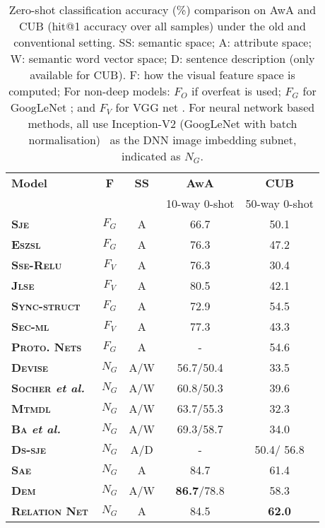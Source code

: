 \documentclass[10pt,twocolumn,letterpaper]{article}
\begin{document}
\setlength{\tabcolsep}{6pt}
\begin{table}[t]
\centering
\footnotesize
\begin{tabular}{@{} lcccc @{}}
\toprule

\textbf{Model} & \textbf{F}     & \textbf{SS}   & \textbf{AwA} & \textbf{CUB} \\ 
 &     &   & 10-way 0-shot & 50-way 0-shot \\ 
\midrule 

\textbf{\textsc{Sje}}~\cite{akata2015evaluation}&$F_{G}$ & A & 66.7 &50.1  \\
\textbf{\textsc{Eszsl}}~\cite{romera2015embarrassingly}&$F_{G}$ & A & 76.3 & 47.2 \\
\textbf{\textsc{Sse}-\textsc{Relu}}~\cite{zhang2015zero}&$F_{V}$ & A & 76.3 & 30.4 \\
\textbf{\textsc{Jlse}}~\cite{zhang2016zero}&$F_{V}$  & A & 80.5 & 42.1 \\ 
\textbf{\textsc{Sync-struct}}~\cite{changpinyo2016synthesized}&$F_{G}$ & A & 72.9 & 54.5 \\ 
\textbf{\textsc{Sec-ml}}~\cite{bucher2016improving}&$F_{V}$  & A & 77.3 & 43.3 \\  
\textbf{\textsc{Proto.} \textsc{Nets}}~\cite{snell2017prototypical}&$F_{G}$ & A & - & 54.6\\ 
\midrule
\textbf{\textsc{Devise}}~\cite{frome2013devise}&$N_{G}$ & A/W &56.7/50.4  &33.5   \\ 
\textbf{\textsc{Socher} {\em et al.}}~\cite{socher2013zero}&$N_{G}$ & A/W & 60.8/50.3 &39.6  \\ 
\textbf{\textsc{Mtmdl}}~\cite{yang2014unified}&$N_{G}$ & A/W &63.7/55.3   &32.3   \\ 
\textbf{\textsc{Ba} {\em et al.}}~\cite{lei2015predicting}&$N_{G}$ & A/W &69.3/58.7  &34.0   \\ 
\textbf{\textsc{Ds-sje}}~\cite{reed2016learning}&$N_{G}$ & A/D & - & 50.4/ 56.8  \\ 
\textbf{\textsc{Sae}}~\cite{kodirov2017semantic}&$N_{G}$ & A & 84.7 & 61.4 \\
\textbf{\textsc{Dem}}~\cite{zhang2017learning}&$N_{G}$ & A/W & \textbf{86.7}/78.8 & 58.3 \\ 
\midrule
\textbf{\textsc{Relation} \textsc{Net}}&$N_{G}$ & A & 84.5 &\textbf{62.0}\\ 
\bottomrule
\end{tabular}
\caption{\footnotesize Zero-shot classification accuracy (\%) comparison on AwA and CUB (hit@1 accuracy over all samples) under the old and conventional setting. SS: semantic space; A: attribute space; W: semantic word vector space; D: sentence description (only available for CUB). F: how the visual feature space is computed; For non-deep models: $F_O$ if overfeat \cite{sermanet2013overfeat} is used; $F_G$ for GoogLeNet \cite{szegedy2015going}; and $F_V$ for VGG net \cite{simonyan2014very}. For neural network based methods, all use Inception-V2 (GoogLeNet with batch normalisation)~\cite{szegedy2015going, ioffe2015batch} as the DNN image imbedding subnet, indicated as $N_G$.}
\label{tab:zsl}
\end{table}
\end{document}
